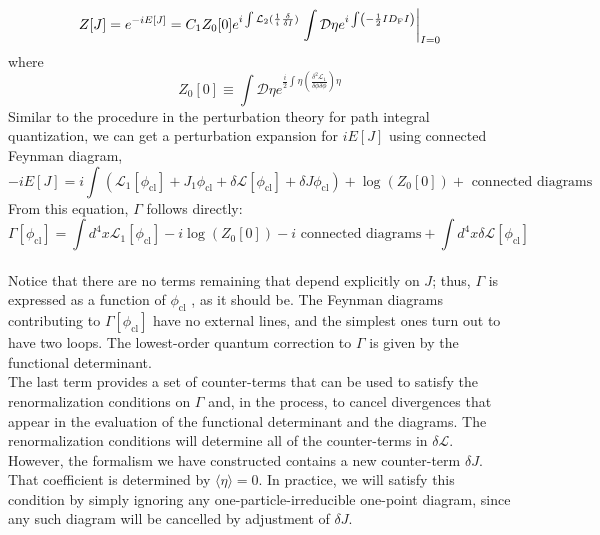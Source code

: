 \[Z[J] = e^{-iE[J]} =C_1 Z_0[0] e^{i\int \mathcal{L}_2(\frac{1}{i} \frac{\delta}{\delta I})} \left. \int \mathcal{D}\eta e^{i\int \left(-\frac{1}{2} I D_{\rm F} I \right)} \right|_{I=0}\]
where
\[Z_0[0] \equiv \int \mathcal{D}\eta e^{ \frac{i}{2}\int \eta \left( \frac{\delta^2 \mathcal{L}_1}{\delta \phi \delta \phi}\right) \eta }\]
Similar to the procedure in the perturbation theory for path integral quantization, we can get a perturbation expansion for $iE[J]$ using connected Feynman diagram,
\[-iE[J] = i \int ( \mathcal{L}_1 [\phi_{\mathrm{cl}}] + J_1\phi_{\mathrm{cl}} + \delta \mathcal{L}[\phi_{\mathrm{cl}}] + \delta J \phi_{\mathrm{cl}} ) + \log(Z_0[0]) + \mbox{ connected diagrams }\]
From this equation, $\Gamma$ follows directly:
\[\Gamma[\phi_{\mathrm{cl}}] = \int d^4x \mathcal{L}_1[\phi_{\mathrm{cl}}] -i\log(Z_0[0]) -i \mbox{ connected diagrams} + \int d^4x \delta\mathcal{L}[\phi_{\mathrm{cl}}]\]
\\
Notice that there are no terms remaining that depend explicitly on $J$; thus, $\Gamma$ is expressed as a function of $\phi_{\mathrm{cl}}$ , as it should be. The Feynman diagrams contributing to $\Gamma[\phi_{\mathrm{cl}}]$ have no external lines, and the simplest ones turn out to have two loops. The lowest-order quantum correction to $\Gamma$ is given by the
functional determinant.
\\
The last term provides a set of counter-terms that can be used
to satisfy the renormalization conditions on $\Gamma$ and, in the process, to cancel divergences that appear in the evaluation of the functional determinant and the diagrams. The renormalization conditions will determine all of the counter-terms in $\delta \mathcal{L}$. However, the formalism we have constructed contains a new counter-term $\delta J$. That coefficient is determined by  $\langle \eta \rangle = 0$. In practice, we will satisfy this condition by simply ignoring any one-particle-irreducible one-point diagram, since any such diagram will be cancelled by adjustment of $\delta J$.

